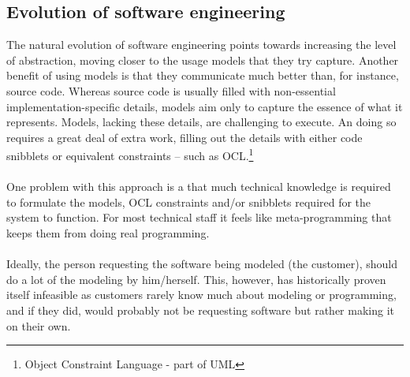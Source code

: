 \subsection{Evolution of software engineering}
The natural evolution of software engineering points towards increasing the level of abstraction, moving closer to the usage models that they try capture. Another benefit of using models is that they communicate much better than, for instance, source code. Whereas source code is usually filled with non-essential implementation-specific details, models aim only to capture the essence of what it represents. Models, lacking these details, are challenging to execute. An doing so requires a great deal of extra work, filling out the details with either code snibblets or equivalent constraints -- such as OCL.\footnote{Object Constraint Language - part of UML}\\\\
One problem with this approach is a that much technical knowledge is required to formulate the models, OCL constraints and/or snibblets required for the system to function. For most technical staff it feels like meta-programming that keeps them from doing real programming.
\\\\
Ideally, the person requesting the software being modeled (the customer), should do a lot of the modeling by him/herself. This, however, has historically proven itself infeasible as customers rarely know much about modeling or programming, and if they did, would probably not be requesting software but rather making it on their own.

